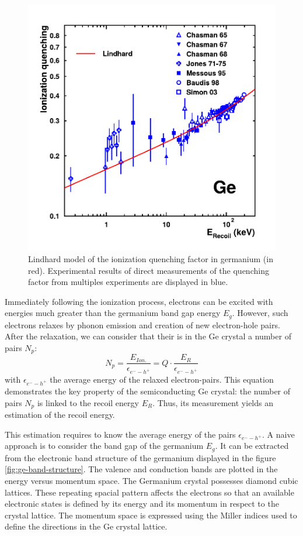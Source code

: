 \begin{figure}
\centering
\includegraphics[scale=0.5]{Figures/Electrodes/ge_quenching.pdf}
\caption{Lindhard model of the ionization quenching factor in germanium (in red). Experimental results of direct measurements of the quenching factor from multiples experiments are displayed in blue.}
\label{fig:ge-quenching}
\end{figure}

Immediately following the ionization process, electrons can be excited with energies much greater than the germanium band gap energy $E_g$. However, such electrons relaxes by phonon emission and creation of new electron-hole pairs. After the relaxation, we can consider that their is in the Ge crystal a number of pairs $N_p$:
\begin{equation}
\label{eq:number-pairs}
N_p = \frac{E_{Ion.}}{\epsilon_{e^--h^+}} =  Q \cdot \frac{E_R}{\epsilon_{e^--h^+}}
\end{equation}
with $\epsilon_{e^--h^+}$ the average energy of the relaxed electron-pairs. This equation demonstrates the key property of the semiconducting Ge crystal: the number of pairs $N_p$ is linked to the recoil energy $E_R$. Thus, its measurement yields an estimation of the recoil energy.

This estimation requires to know the average energy of the pairs $\epsilon_{e^--h^+}$. A naive approach is to consider the band gap of the germanium $E_g$. It can be extracted from the electronic band structure of the germanium displayed in the figure \ref{fig:ge-band-structure}. The valence and conduction bands are plotted in the energy versus momentum space. The Germanium crystal possesses diamond cubic lattices. These repeating spacial pattern affects the electrons so that an available electronic states is defined by its energy and its momentum in respect to the crystal lattice. The momentum space is expressed using the Miller indices used to define the directions in the Ge crystal lattice.

